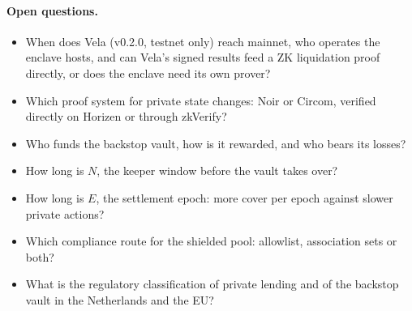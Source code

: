 \documentclass[11pt,a4paper]{article}
\begin{document}
\paragraph{Open questions.}
\begin{itemize}
  \item When does Vela (v0.2.0, testnet only) reach mainnet, who operates the enclave hosts, and can Vela's
        signed results feed a ZK liquidation proof directly, or does the enclave need its own prover?
  \item Which proof system for private state changes: Noir or Circom, verified directly on Horizen or through
        zkVerify?
  \item Who funds the backstop vault, how is it rewarded, and who bears its losses?
  \item How long is $N$, the keeper window before the vault takes over?
  \item How long is $E$, the settlement epoch: more cover per epoch against slower private actions?
  \item Which compliance route for the shielded pool: allowlist, association sets or both?
  \item What is the regulatory classification of private lending and of the backstop vault in the Netherlands
        and the EU?
\end{itemize}

\FloatBarrier
\begingroup\raggedright


\endgroup
\end{document}
